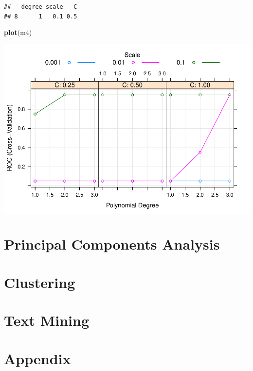 \documentclass[
]{book}
\newenvironment{Shaded}{\begin{snugshade}}{\end{snugshade}}
\newcommand{\KeywordTok}[1]{\textcolor[rgb]{0.13,0.29,0.53}{\textbf{#1}}}
\newcommand{\NormalTok}[1]{#1}
\begin{document}
\begin{verbatim}
##   degree scale   C
## 8      1   0.1 0.5
\end{verbatim}

\begin{Shaded}
\begin{Highlighting}[]
\KeywordTok{plot}\NormalTok{(m4)}
\end{Highlighting}
\end{Shaded}

\includegraphics{data-sci_files/figure-latex/unnamed-chunk-131-1.pdf}

\hypertarget{principal-components-analysis}{%
\chapter{Principal Components Analysis}\label{principal-components-analysis}}

\hypertarget{clustering}{%
\chapter{Clustering}\label{clustering}}

\hypertarget{text-mining}{%
\chapter{Text Mining}\label{text-mining}}

\hypertarget{appendix}{%
\chapter*{Appendix}\label{appendix}}
\end{document}
